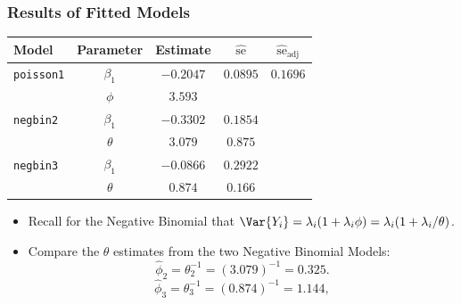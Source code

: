 \documentclass[oneside]{book}\usepackage[]{graphicx}\usepackage[svgnames]{xcolor}
\begin{document}
\subsubsection*{Results of Fitted Models}
\begin{table}[H]
    \centering
    \begin{tabular}{lcccc}
        Model             & Parameter   & Estimate    & $ \widehat{\text{se}} $ & $ \widehat{\text{se}}_{\text{adj}} $ \\
        \midrule
        \texttt{poisson1} & $ \beta_1 $ & $ -0.2047 $ & $ 0.0895 $              & $0.1696$                             \\
                          & $ \phi $    & $3.593$                                                                      \\
        \texttt{negbin2}  & $ \beta_1 $ & $ -0.3302 $ & $ 0.1854 $                                                     \\
                          & $ \theta $  & $3.079$     & $0.875$                                                        \\
        \texttt{negbin3}  & $ \beta_1 $ & $ -0.0866 $ & $ 0.2922 $                                                     \\
                          & $ \theta $  & $0.874$     & $0.166$                                                        \\
        \bottomrule
    \end{tabular}
\end{table}
\begin{itemize}
    \item Recall for the Negative Binomial that $ \Var{Y_i}=\lambda_i(1+\lambda_i\phi)=\lambda_i(1+\lambda_i/\theta) $.
    \item Compare the $ \theta $ estimates from the two Negative Binomial Models:
          \[ \hat{\phi}_2=\theta_2^{-1}=(3.079)^{-1}=0.325. \]
          \[ \hat{\phi}_3=\theta_3^{-1}=(0.874)^{-1}=1.144, \]
\end{itemize}
\end{document}
